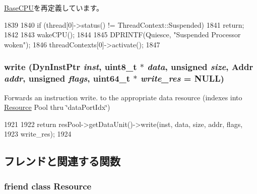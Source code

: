 \hyperlink{classBaseCPU_a75101f8aee74078c8c3c1d1f3617f7cc}{BaseCPU}を再定義しています。


\begin{DoxyCode}
1839 {
1840     if (thread[0]->status() != ThreadContext::Suspended)
1841         return;
1842 
1843     wakeCPU();
1844 
1845     DPRINTF(Quiesce, "Suspended Processor woken\n");
1846     threadContexts[0]->activate();
1847 }
\end{DoxyCode}
\hypertarget{classInOrderCPU_aa5c5cc302819b0824df50495f6ffd319}{
\subsubsection[{write}]{ write ({\bf DynInstPtr} {\em inst}, \/  uint8\_\-t $\ast$ {\em data}, \/  unsigned {\em size}, \/  {\bf Addr} {\em addr}, \/  unsigned {\em flags}, \/  uint64\_\-t $\ast$ {\em write\_\-res} = {\ttfamily NULL})}}
\label{classInOrderCPU_aa5c5cc302819b0824df50495f6ffd319}
Forwards an instruction write. to the appropriate data resource (indexes into \hyperlink{classResource}{Resource} Pool thru \char`\"{}dataPortIdx\char`\"{}) 


\begin{DoxyCode}
1921 {
1922     return resPool->getDataUnit()->write(inst, data, size, addr, flags,
1923                                          write_res);
1924 }
\end{DoxyCode}


\subsection{フレンドと関連する関数}
\hypertarget{classInOrderCPU_a0ebbdc315d2466b93b663656f9d9ab44}{
\subsubsection[{Resource}]{\setlength{\rightskip}{0pt plus 5cm}friend class {\bf Resource}}}
\label{classInOrderCPU_a0ebbdc315d2466b93b663656f9d9ab44}


